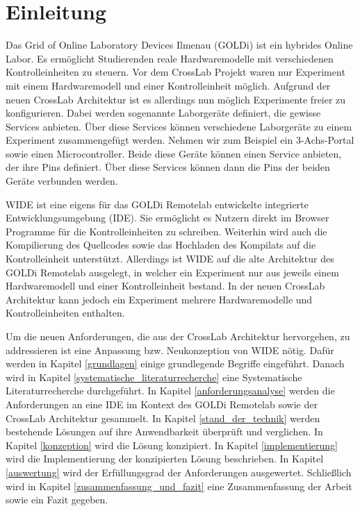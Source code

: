 \chapter{Einleitung}

Das Grid of Online Laboratory Devices Ilmenau (GOLDi) ist ein hybrides Online Labor. Es ermöglicht Studierenden reale Hardwaremodelle mit verschiedenen Kontrolleinheiten zu steuern. Vor dem CrossLab Projekt waren nur Experiment mit einem Hardwaremodell und einer Kontrolleinheit möglich. Aufgrund der neuen CrossLab Architektur ist es allerdings nun möglich Experimente freier zu konfigurieren. Dabei werden sogenannte Laborgeräte definiert, die gewisse Services anbieten. Über diese Services können verschiedene Laborgeräte zu einem Experiment zusammengefügt werden. Nehmen wir zum Beispiel ein 3-Achs-Portal sowie einen Microcontroller. Beide diese Geräte können einen Service anbieten, der ihre Pins definiert. Über diese Services können dann die Pins der beiden Geräte verbunden werden.

WIDE ist eine eigens für das GOLDi Remotelab entwickelte integrierte Entwicklungsumgebung (IDE). Sie ermöglicht es Nutzern direkt im Browser Programme für die Kontrolleinheiten zu schreiben. Weiterhin wird auch die Kompilierung des Quellcodes sowie das Hochladen des Kompilats auf die Kontrolleinheit unterstützt. Allerdings ist WIDE auf die alte Architektur des GOLDi Remotelab ausgelegt, in welcher ein Experiment nur aus jeweils einem Hardwaremodell und einer Kontrolleinheit bestand. In der neuen CrossLab Architektur kann jedoch ein Experiment mehrere Hardwaremodelle und Kontrolleinheiten enthalten.

Um die neuen Anforderungen, die aus der CrossLab Architektur hervorgehen, zu addressieren ist eine Anpassung bzw. Neukonzeption von WIDE nötig. Dafür werden in Kapitel \ref{grundlagen} einige grundlegende Begriffe eingeführt. Danach wird in Kapitel \ref{systematische_literaturrecherche} eine Systematische Literaturrecherche durchgeführt. In Kapitel \ref{anforderungsanalyse} werden die Anforderungen an eine IDE im Kontext des GOLDi Remotelab sowie der CrossLab Architektur gesammelt. In Kapitel \ref{stand_der_technik} werden bestehende Lösungen auf ihre Anwendbarkeit überprüft und verglichen. In Kapitel \ref{konzeption} wird die Lösung konzipiert. In Kapitel \ref{implementierung} wird die Implementierung der konzipierten Lösung beschrieben. In Kapitel \ref{auswertung} wird der Erfüllungsgrad der Anforderungen ausgewertet. Schließlich wird in Kapitel \ref{zusammenfassung_und_fazit} eine Zusammenfassung der Arbeit sowie ein Fazit gegeben.